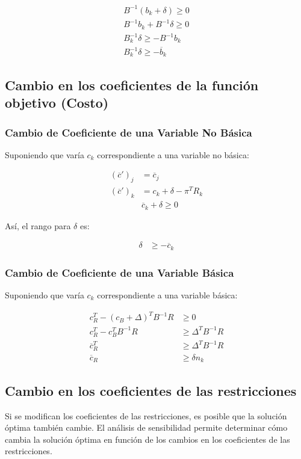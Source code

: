 \documentclass{article}
\begin{document}
\begin{align*}
    B^{-1}(b_k + \delta) \geq 0\\
    B^{-1}b_k + B^{-1}\delta \geq 0\\
    B^{-1}_k\delta \geq -B^{-1}b_k\\
    B_k^{-1}\delta \geq -\overline{b}_k
\end{align*}

\subsection{Cambio en los coeficientes de la función objetivo (Costo)}
\subsubsection{Cambio de Coeficiente de una Variable No Básica}

Suponiendo que varía $c_k$ correspondiente a una variable no básica:

\begin{align*}
    (\overline{c}')_j &= \overline{c}_j \\
    (\overline{c}')_k &= {c}_k + \delta - \pi^T R_k \\
    & \overline{c}_k + \delta \geq 0
\end{align*}

Así, el rango para $\delta$ es:

\begin{align*}
    \delta &\geq -\overline{c}_k
\end{align*}

\subsubsection{Cambio de Coeficiente de una Variable Básica}

Suponiendo que varía $c_k$ correspondiente a una variable básica:

\begin{align*}
    c_R^T - (c_B + \Delta)^TB^{-1}R &\geq 0\\
    c_R^T - c_B^TB^{-1}R &\geq \Delta^TB^{-1}R\\
    \overline{c}_R^T &\geq \Delta^TB^{-1}R\\
    \overline{c}_R &\geq \delta n_k
\end{align*}

\subsection{Cambio en los coeficientes de las restricciones}
Si se modifican los coeficientes de las restricciones, es posible que la solución óptima también cambie. El análisis de sensibilidad permite determinar cómo cambia la solución óptima en función de los cambios en los coeficientes de las restricciones.
\end{document}
